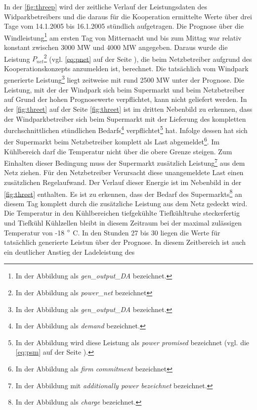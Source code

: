 In der \cref{fig:threep} wird der zeitliche Verlauf der Leistungsdaten des
Widparkbetreibers und die daraus f\"ur die Kooperation ermittelte Werte \"uber
drei Tage vom 14.1.2005 bis 16.1.2005 st\"undlich aufgetragen. Die Prognose
\"uber die Windleistung\footnote{ In der Abbildung als \textit{gen\_output\_DA}
bezeichnet.} am ersten Tag von Mitternacht und bis zum Mittag war relativ
konstant zwischen 3000 MW und 4000 MW angegeben. Daraus wurde die Leistung
$P_{net}$\footnote{ In der Abbildung als \textit{power\_net} bezeichnet} (vgl.
\cref{eq:pnet} auf der Seite \pageref{eq:pnet}), die beim Netzbetreiber aufgrund
des Kooperationskonzepts anzumelden ist, berechnet. Die tats\"achlich vom
Windpark generierte Leistung\footnote{ In der Abbildung als
\textit{gen\_output\_DA} bezeichnet.} liegt zeitweise mit rund 2500 MW unter der
Prognose. Die Leistung, mit der der Windpark sich beim Supermarkt und beim
Netzbetreiber auf Grund der hohen Prognosewerte verpflichtet, kann nicht
geliefert werden. In der \cref{fig:threet} auf der Seite \cref{fig:threet} ist
im dritten Nebenbild zu erkennen, dass der
Windparkbetreiber sich beim Supermarkt mit der Lieferung des kompletten
durchschnittlichen st\"undlichen Bedarfs\footnote{ In der Abbildung als
\textit{demand} bezeichnet.} verpflichtet\footnote{ In der Abbildung wird diese
Leistung als \textit{power promised} bezeichnet (vgl. die \cref{eq:psm} auf der
Seite \pageref{eq:psm}).} hat. Infolge dessen hat sich der Supermarkt beim
Netzbetreiber komplett als Last abgemeldet\footnote{ In der Abbildung als
\textit{firm commitment} bezeichnet}. Im K\"uhlbereich darf die Temperatur
nicht \"uber die obere Grenze steigen. Zum Einhalten dieser Bedingung muss der
Supermarkt zus\"atzlich Leistung\footnote{ In der Abbildung mit
\textit{additionally power bezeichnet} bezeichnet.} aus dem Netz ziehen. F\"ur
den Netzbetreiber Verursacht diese unangemeldete Last einen zus\"atzlichen
Regelaufwand. Der Verlauf dieser Energie ist im Nebenbild in der
\cref{fig:threet} enthalten. Es ist zu erkennen, dass der Bedarf des
Supermarkts\footnote{ In der Abbildung als \textit{charge} bezeichnet.}
an diesem Tag komplett durch die zus\"atzliche Leistung aus dem Netz gedeckt
wird. Die Temperatur in den K\"uhlbereichen tiefgek\"uhlte Tiefk\"uhltruhe
steckerfertig und Tiefk\"uhl K\"uhlzellen bleibt in diesem Zeitraum bei der
maximal zul\"assigen Temperatur von -18 $^\circ$ C. In den Stunden 27 bis 30
liegen die Werte f\"ur tats\"achlich generierte Leistun \"uber der Prognose. In
diesem Zeitbereich ist auch ein deutlicher Anstieg der Ladeleistung des
